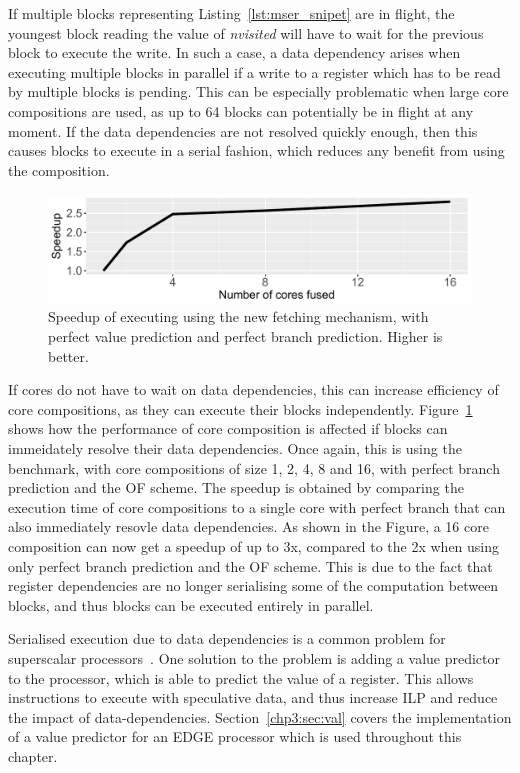 If multiple blocks representing Listing~\ref{lst:mser_snipet} are in flight, the youngest block reading the value of \textit{nvisited} will have to wait for the previous block to execute the write.
In such a case, a data dependency arises when executing multiple blocks in parallel if a write to a register which has to be read by multiple blocks is pending.
This can be especially problematic when large core compositions are used, as up to 64 blocks can potentially be in flight at any moment.
If the data dependencies are not resolved quickly enough, then this causes blocks to execute in a serial fashion, which reduces any benefit from using the composition.

\begin{figure}[t]
    \centering
    \includegraphics[width=1\textwidth]{chapter3/graphics/mser_motiv_reg.pdf}
    \caption{Speedup of executing  using the new fetching mechanism, with perfect value prediction and perfect branch prediction. Higher is better.}
    \label{fig:motivation_reg}
	\vspace{1em}
\end{figure}

If cores do not have to wait on data dependencies, this can increase efficiency of core compositions, as they can execute their blocks independently.
Figure~\ref{fig:motivation_reg} shows how the performance of core composition is affected if blocks can immeidately resolve their data dependencies.
Once again, this is using the  benchmark, with core compositions of size 1, 2, 4, 8 and 16, with perfect branch prediction and the OF scheme.
The speedup is obtained by comparing the execution time of core compositions to a single core with perfect branch that can also immediately resovle data dependencies.
As shown in the Figure, a 16 core composition can now get a speedup of up to 3x, compared to the 2x when using only perfect branch prediction and the OF scheme.
This is due to the fact that register dependencies are no longer serialising some of the computation between blocks, and thus blocks can be executed entirely in parallel.

Serialised execution due to data dependencies is a common problem for superscalar processors~\cite{peraisVTAGE2014}.
One solution to the problem is adding a value predictor to the processor, which is able to predict the value of a register.
This allows instructions to execute with speculative data, and thus increase ILP and reduce the impact of data-dependencies.
Section~\ref{chp3:sec:val} covers the implementation of a value predictor for an EDGE processor which is used throughout this chapter.

